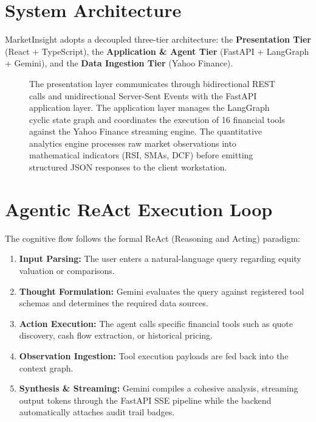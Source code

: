 \documentclass[12pt,a4paper]{report}
\begin{document}
\section{System Architecture}

MarketInsight adopts a decoupled three-tier architecture: the \textbf{Presentation Tier} (React + TypeScript), the \textbf{Application \& Agent Tier} (FastAPI + LangGraph + Gemini), and the \textbf{Data Ingestion Tier} (Yahoo Finance).

\begin{figure}[h!]
\centering
\begin{tcolorbox}[colback=white,colframe=cbitred,title=\textbf{Figure 3.1: Three-Tier System Architecture Overview},fonttitle=\bfseries\small]
\centering
\small
The presentation layer communicates through bidirectional REST calls and unidirectional Server-Sent Events with the FastAPI application layer. The application layer manages the LangGraph cyclic state graph and coordinates the execution of 16 financial tools against the Yahoo Finance streaming engine. The quantitative analytics engine processes raw market observations into mathematical indicators (RSI, SMAs, DCF) before emitting structured JSON responses to the client workstation.
\end{tcolorbox}
\end{figure}

\section{Agentic ReAct Execution Loop}

The cognitive flow follows the formal ReAct (Reasoning and Acting) paradigm:
\begin{enumerate}[leftmargin=*,label=\textbf{\arabic*.}]
  \item \textbf{Input Parsing:} The user enters a natural-language query regarding equity valuation or comparisons.
  \item \textbf{Thought Formulation:} Gemini evaluates the query against registered tool schemas and determines the required data sources.
  \item \textbf{Action Execution:} The agent calls specific financial tools such as quote discovery, cash flow extraction, or historical pricing.
  \item \textbf{Observation Ingestion:} Tool execution payloads are fed back into the context graph.
  \item \textbf{Synthesis \& Streaming:} Gemini compiles a cohesive analysis, streaming output tokens through the FastAPI SSE pipeline while the backend automatically attaches audit trail badges.
\end{enumerate}
\end{document}

